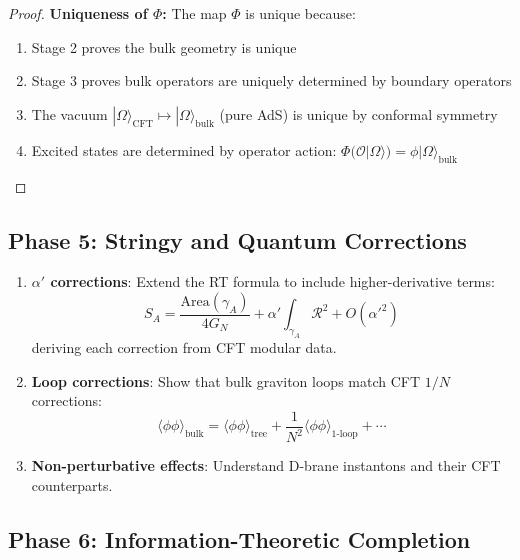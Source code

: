 \documentclass[12pt,a4paper]{article}
\begin{document}
\begin{proof}
\textbf{Uniqueness of $\Phi$:} The map $\Phi$ is unique because:
\begin{enumerate}
    \item Stage 2 proves the bulk geometry is unique
    \item Stage 3 proves bulk operators are uniquely determined by boundary operators
    \item The vacuum $|\Omega\rangle_{\text{CFT}} \mapsto |\Omega\rangle_{\text{bulk}}$ (pure AdS) is unique by conformal symmetry
    \item Excited states are determined by operator action: $\Phi(\mathcal{O}|\Omega\rangle) = \phi|\Omega\rangle_{\text{bulk}}$
\end{enumerate}
\end{proof}

\subsection{Phase 5: Stringy and Quantum Corrections}

\begin{enumerate}
    \item \textbf{$\alpha'$ corrections}: Extend the RT formula to include higher-derivative terms:
    \begin{equation}
    S_A = \frac{\text{Area}(\gamma_A)}{4G_N} + \alpha' \int_{\gamma_A} \mathcal{R}^2 + O(\alpha'^2)
    \end{equation}
    deriving each correction from CFT modular data.
    
    \item \textbf{Loop corrections}: Show that bulk graviton loops match CFT $1/N$ corrections:
    \begin{equation}
    \langle \phi \phi \rangle_{\text{bulk}} = \langle \phi \phi \rangle_{\text{tree}} + \frac{1}{N^2} \langle \phi \phi \rangle_{\text{1-loop}} + \cdots
    \end{equation}
    
    \item \textbf{Non-perturbative effects}: Understand D-brane instantons and their CFT counterparts.
\end{enumerate}

\subsection{Phase 6: Information-Theoretic Completion}
\end{document}
